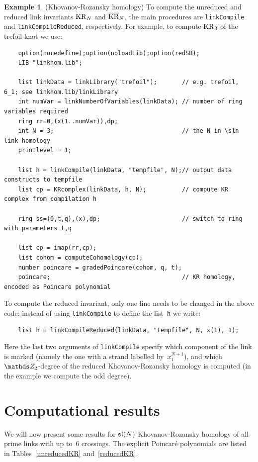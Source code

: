 \documentclass{compositio}
\theoremstyle{definition}
\newtheorem{example}[theorem]{Example}
\numberwithin{equation}{section}
\begin{document}
\begin{example}(Khovanov-Rozansky homology) \label{KRexample}
To compute the unreduced and reduced link invariants $\operatorname{KR}_{N}$ and $\overline{\operatorname{KR}}_{N}$, the main procedures are \texttt{linkCompile} and \texttt{linkCompileReduced}, respectively. For example, to compute $\operatorname{KR}_{3}$ of the trefoil knot we use: 
{\footnotesize
\begin{verbatim}
    option(noredefine);option(noloadLib);option(redSB);
    LIB "linkhom.lib";
    
    list linkData = linkLibrary("trefoil");       // e.g. trefoil, 6_1; see linkhom.lib/linkLibrary
    int numVar = linkNumberOfVariables(linkData); // number of ring variables required
    ring rr=0,(x(1..numVar)),dp;
    int N = 3;                                    // the N in \sln link homology
    printlevel = 1;
    
    list h = linkCompile(linkData, "tempfile", N);// output data constructs to tempfile
    list cp = KRcomplex(linkData, h, N);          // compute KR complex from compilation h
    
    ring ss=(0,t,q),(x),dp;                       // switch to ring with parameters t,q
    
    list cp = imap(rr,cp);
    list cohom = computeCohomology(cp);
    number poincare = gradedPoincare(cohom, q, t);
    poincare;                                     // KR homology, encoded as Poincare polynomial
\end{verbatim}
}
\noindent To compute the reduced invariant, only one line needs to be changed in the above code: instead of using \texttt{linkCompile} to define the list~\texttt{h} we write: 
{\footnotesize
\begin{verbatim}
    list h = linkCompileReduced(linkData, "tempfile", N, x(1), 1);
\end{verbatim}
}
\noindent Here the last two arguments of \texttt{linkCompile} specify which component of the link is marked (namely the one with a strand labelled by~$x_{1}^{N+1}$), and which $\nZ_{2}$-degree of the reduced Khovanov-Rozansky homology is computed (in the example we compute the odd degree). 
\end{example}



\section{Computational results}
\label{compres}

We will now present some results for $\mathfrak{sl}(N)$ Khovanov-Rozansky homology of all prime links with up to~6 crossings. The explicit Poincar\'e polynomials are listed in Tables~\ref{unreducedKR} and~\ref{reducedKR}. 
\end{document}
